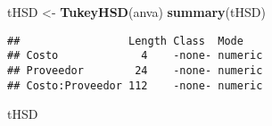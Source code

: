 \documentclass[]{article}
\newenvironment{Shaded}{\begin{snugshade}}{\end{snugshade}}
\newcommand{\KeywordTok}[1]{\textcolor[rgb]{0.13,0.29,0.53}{\textbf{#1}}}
\newcommand{\NormalTok}[1]{#1}
\newcommand{\StringTok}[1]{\textcolor[rgb]{0.31,0.60,0.02}{#1}}
\begin{document}
\begin{Shaded}
\begin{Highlighting}[]
\NormalTok{tHSD <-}\StringTok{ }\KeywordTok{TukeyHSD}\NormalTok{(anva)}
\KeywordTok{summary}\NormalTok{(tHSD)}
\end{Highlighting}
\end{Shaded}

\begin{verbatim}
##                 Length Class  Mode   
## Costo             4    -none- numeric
## Proveedor        24    -none- numeric
## Costo:Proveedor 112    -none- numeric
\end{verbatim}

\begin{Shaded}
\begin{Highlighting}[]
\NormalTok{tHSD}
\end{Highlighting}
\end{Shaded}
\end{document}
